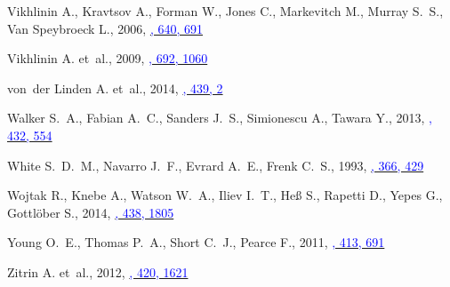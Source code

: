 \documentclass[useAMS,usenatbib,usegraphicx]{mn2e}
\begin{document}
\begin{thebibliography}{}
{Vikhlinin} A., {Kravtsov} A., {Forman} W., {Jones} C., {Markevitch} M.,
  {Murray} S.~S.,  {Van Speybroeck} L., 2006,
  \href{http://adsabs.harvard.edu/abs/2006ApJ...640..691V}{\textcolor{blue}{\apj,
  640, 691}}

{Vikhlinin} A. et~al., 2009,
  \href{http://adsabs.harvard.edu/abs/2009ApJ...692.1060V}{\textcolor{blue}{\apj,
  692, 1060}}

von~der {Linden} A. et~al., 2014,
  \href{http://adsabs.harvard.edu/abs/2014MNRAS.439....2V}{\textcolor{blue}{\mnras,
  439, 2}}

{Walker} S.~A., {Fabian} A.~C., {Sanders} J.~S., {Simionescu} A.,  {Tawara} Y.,
  2013,
  \href{http://adsabs.harvard.edu/abs/2013MNRAS.432..554W}{\textcolor{blue}{\mnras,
  432, 554}}

{White} S.~D.~M., {Navarro} J.~F., {Evrard} A.~E.,  {Frenk} C.~S., 1993,
  \href{http://adsabs.harvard.edu/abs/1993Natur.366..429W}{\textcolor{blue}{\nat,
  366, 429}}

{Wojtak} R., {Knebe} A., {Watson} W.~A., {Iliev} I.~T., {He{\ss}} S., {Rapetti}
  D., {Yepes} G.,  {Gottl{\"o}ber} S., 2014,
  \href{http://adsabs.harvard.edu/abs/2014MNRAS.438.1805W}{\textcolor{blue}{\mnras,
  438, 1805}}

{Young} O.~E., {Thomas} P.~A., {Short} C.~J.,  {Pearce} F., 2011,
  \href{http://adsabs.harvard.edu/abs/2011MNRAS.413..691Y}{\textcolor{blue}{\mnras,
  413, 691}}

{Zitrin} A. et~al., 2012,
  \href{http://adsabs.harvard.edu/abs/2012MNRAS.420.1621Z}{\textcolor{blue}{\mnras,
  420, 1621}}

\end{thebibliography}
\end{document}
